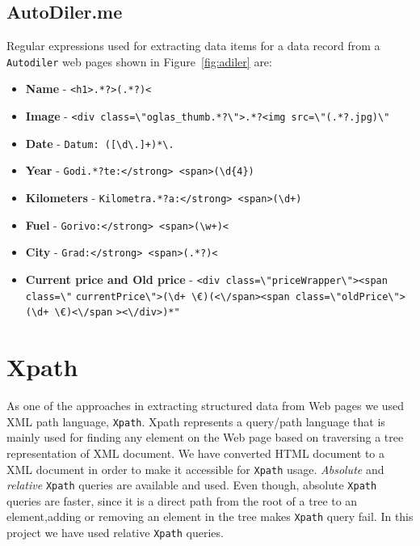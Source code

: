 \documentclass{article}
\begin{document}
	\subsection{AutoDiler.me}
	Regular expressions used for extracting data items for a data record from a \texttt{Autodiler} web pages shown in Figure~\ref{fig:adiler} are:
	\begin{itemize}
		\item \textbf{Name} - \verb|<h1>.*?>(.*?)<|
		\item \textbf{Image} - \verb|<div class=\"oglas_thumb.*?\">.*?<img src=\"(.*?.jpg)\"|
		\item \textbf{Date} - \verb|Datum: ([\d\.]+)*\.|
		\item \textbf{Year} - \verb|Godi.*?te:</strong> <span>(\d{4})|
		\item \textbf{Kilometers} - \verb|Kilometra.*?a:</strong> <span>(\d+)|
		\item \textbf{Fuel} - \verb|Gorivo:</strong> <span>(\w+)<| 
		\item \textbf{City} - \verb|Grad:</strong> <span>(.*?)<|
		\item \textbf{Current price and Old price} - \verb|<div class=\"priceWrapper\"><span class=\"|
		\verb|currentPrice\">(\d+ \€)(<\/span><span class=\"oldPrice\">(\d+ \€)<\/span|
		\verb|><\/div>)*"|
	\end{itemize}
	
	\section{Xpath}
	As one of the approaches in extracting structured data from Web pages we used XML path language, \texttt{Xpath}. Xpath represents a query/path language that is mainly used for finding any element on the Web page based on traversing a tree representation of XML document. We have converted HTML document to a XML document in order to make it accessible for \texttt{Xpath} usage.
	\textit{Absolute} and \textit{relative} \texttt{Xpath} queries are available and used. Even though, absolute \texttt{Xpath} queries are faster, since it is a direct path from the root of a tree to an element,adding or removing an element in the tree makes \texttt{Xpath} query fail. In this project we have used relative \texttt{Xpath} queries.
	
\end{document}
